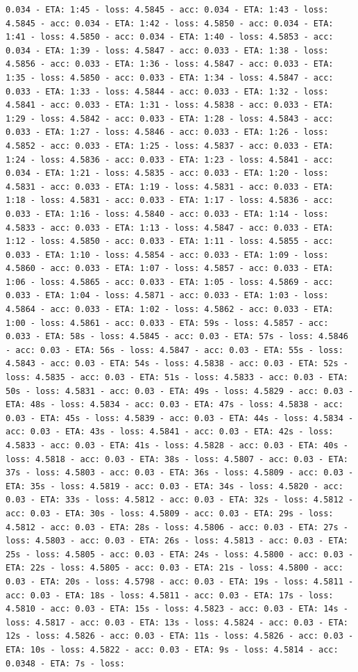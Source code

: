 \documentclass[11pt]{article}
\begin{document}
\begin{Verbatim}[commandchars=\\\{\}]
0.034 - ETA: 1:45 - loss: 4.5845 - acc: 0.034 - ETA: 1:43 - loss: 4.5845 - acc: 0.034 - ETA: 1:42 - loss: 4.5850 - acc: 0.034 - ETA: 1:41 - loss: 4.5850 - acc: 0.034 - ETA: 1:40 - loss: 4.5853 - acc: 0.034 - ETA: 1:39 - loss: 4.5847 - acc: 0.033 - ETA: 1:38 - loss: 4.5856 - acc: 0.033 - ETA: 1:36 - loss: 4.5847 - acc: 0.033 - ETA: 1:35 - loss: 4.5850 - acc: 0.033 - ETA: 1:34 - loss: 4.5847 - acc: 0.033 - ETA: 1:33 - loss: 4.5844 - acc: 0.033 - ETA: 1:32 - loss: 4.5841 - acc: 0.033 - ETA: 1:31 - loss: 4.5838 - acc: 0.033 - ETA: 1:29 - loss: 4.5842 - acc: 0.033 - ETA: 1:28 - loss: 4.5843 - acc: 0.033 - ETA: 1:27 - loss: 4.5846 - acc: 0.033 - ETA: 1:26 - loss: 4.5852 - acc: 0.033 - ETA: 1:25 - loss: 4.5837 - acc: 0.033 - ETA: 1:24 - loss: 4.5836 - acc: 0.033 - ETA: 1:23 - loss: 4.5841 - acc: 0.034 - ETA: 1:21 - loss: 4.5835 - acc: 0.033 - ETA: 1:20 - loss: 4.5831 - acc: 0.033 - ETA: 1:19 - loss: 4.5831 - acc: 0.033 - ETA: 1:18 - loss: 4.5831 - acc: 0.033 - ETA: 1:17 - loss: 4.5836 - acc: 0.033 - ETA: 1:16 - loss: 4.5840 - acc: 0.033 - ETA: 1:14 - loss: 4.5833 - acc: 0.033 - ETA: 1:13 - loss: 4.5847 - acc: 0.033 - ETA: 1:12 - loss: 4.5850 - acc: 0.033 - ETA: 1:11 - loss: 4.5855 - acc: 0.033 - ETA: 1:10 - loss: 4.5854 - acc: 0.033 - ETA: 1:09 - loss: 4.5860 - acc: 0.033 - ETA: 1:07 - loss: 4.5857 - acc: 0.033 - ETA: 1:06 - loss: 4.5865 - acc: 0.033 - ETA: 1:05 - loss: 4.5869 - acc: 0.033 - ETA: 1:04 - loss: 4.5871 - acc: 0.033 - ETA: 1:03 - loss: 4.5864 - acc: 0.033 - ETA: 1:02 - loss: 4.5862 - acc: 0.033 - ETA: 1:00 - loss: 4.5861 - acc: 0.033 - ETA: 59s - loss: 4.5857 - acc: 0.033 - ETA: 58s - loss: 4.5845 - acc: 0.03 - ETA: 57s - loss: 4.5846 - acc: 0.03 - ETA: 56s - loss: 4.5847 - acc: 0.03 - ETA: 55s - loss: 4.5843 - acc: 0.03 - ETA: 54s - loss: 4.5838 - acc: 0.03 - ETA: 52s - loss: 4.5835 - acc: 0.03 - ETA: 51s - loss: 4.5833 - acc: 0.03 - ETA: 50s - loss: 4.5831 - acc: 0.03 - ETA: 49s - loss: 4.5829 - acc: 0.03 - ETA: 48s - loss: 4.5834 - acc: 0.03 - ETA: 47s - loss: 4.5838 - acc: 0.03 - ETA: 45s - loss: 4.5839 - acc: 0.03 - ETA: 44s - loss: 4.5834 - acc: 0.03 - ETA: 43s - loss: 4.5841 - acc: 0.03 - ETA: 42s - loss: 4.5833 - acc: 0.03 - ETA: 41s - loss: 4.5828 - acc: 0.03 - ETA: 40s - loss: 4.5818 - acc: 0.03 - ETA: 38s - loss: 4.5807 - acc: 0.03 - ETA: 37s - loss: 4.5803 - acc: 0.03 - ETA: 36s - loss: 4.5809 - acc: 0.03 - ETA: 35s - loss: 4.5819 - acc: 0.03 - ETA: 34s - loss: 4.5820 - acc: 0.03 - ETA: 33s - loss: 4.5812 - acc: 0.03 - ETA: 32s - loss: 4.5812 - acc: 0.03 - ETA: 30s - loss: 4.5809 - acc: 0.03 - ETA: 29s - loss: 4.5812 - acc: 0.03 - ETA: 28s - loss: 4.5806 - acc: 0.03 - ETA: 27s - loss: 4.5803 - acc: 0.03 - ETA: 26s - loss: 4.5813 - acc: 0.03 - ETA: 25s - loss: 4.5805 - acc: 0.03 - ETA: 24s - loss: 4.5800 - acc: 0.03 - ETA: 22s - loss: 4.5805 - acc: 0.03 - ETA: 21s - loss: 4.5800 - acc: 0.03 - ETA: 20s - loss: 4.5798 - acc: 0.03 - ETA: 19s - loss: 4.5811 - acc: 0.03 - ETA: 18s - loss: 4.5811 - acc: 0.03 - ETA: 17s - loss: 4.5810 - acc: 0.03 - ETA: 15s - loss: 4.5823 - acc: 0.03 - ETA: 14s - loss: 4.5817 - acc: 0.03 - ETA: 13s - loss: 4.5824 - acc: 0.03 - ETA: 12s - loss: 4.5826 - acc: 0.03 - ETA: 11s - loss: 4.5826 - acc: 0.03 - ETA: 10s - loss: 4.5822 - acc: 0.03 - ETA: 9s - loss: 4.5814 - acc: 0.0348 - ETA: 7s - loss: 
\end{Verbatim}
\end{document}

